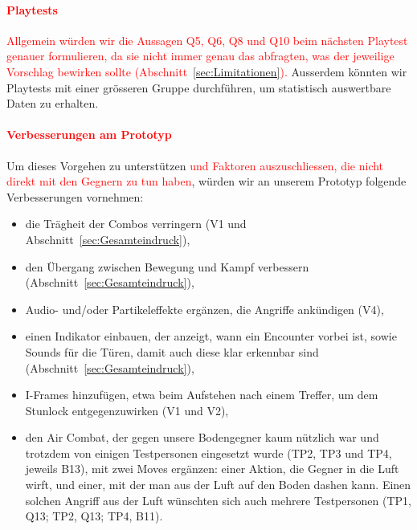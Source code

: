 \documentclass[../Main.tex]{subfiles}
\begin{document}
\paragraph{\textcolor{red}{Playtests}}
\textcolor{red}{Allgemein würden wir die Aussagen Q5, Q6, Q8 und Q10 beim nächsten Playtest genauer formulieren, da sie nicht immer genau das abfragten, was der jeweilige Vorschlag bewirken sollte (Abschnitt~\ref{sec:Limitationen}).} Ausserdem könnten wir Playtests mit einer grösseren Gruppe durchführen, um statistisch auswertbare Daten zu erhalten.

\paragraph{\textcolor{red}{Verbesserungen am Prototyp}}
Um dieses Vorgehen zu unterstützen \textcolor{red}{und Faktoren auszuschliessen, die nicht direkt mit den Gegnern zu tun haben}, würden wir an unserem Prototyp folgende Verbesserungen vornehmen:

\begin{itemize}[leftmargin=1.5cm]
    \item die Trägheit der Combos verringern (V1 und Abschnitt~\ref{sec:Gesamteindruck}),
    \item den Übergang zwischen Bewegung und Kampf verbessern (Abschnitt~\ref{sec:Gesamteindruck}),
    \item Audio- und/oder Partikeleffekte ergänzen, die Angriffe ankündigen (V4),
    \item einen Indikator einbauen, der anzeigt, wann ein Encounter vorbei ist, sowie Sounds für die Türen, damit auch diese klar erkennbar sind (Abschnitt~\ref{sec:Gesamteindruck}),
    \item I-Frames hinzufügen, etwa beim Aufstehen nach einem Treffer, um dem Stunlock entgegenzuwirken (V1 und V2),
    \item den Air Combat, der gegen unsere Bodengegner kaum nützlich war und trotzdem von einigen Testpersonen eingesetzt wurde (TP2, TP3 und TP4, jeweils B13), mit zwei Moves ergänzen: einer Aktion, die Gegner in die Luft wirft, und einer, mit der man aus der Luft auf den Boden dashen kann. Einen solchen Angriff aus der Luft wünschten sich auch mehrere Testpersonen (TP1, Q13; TP2, Q13; TP4, B11).
\end{itemize}
\end{document}
